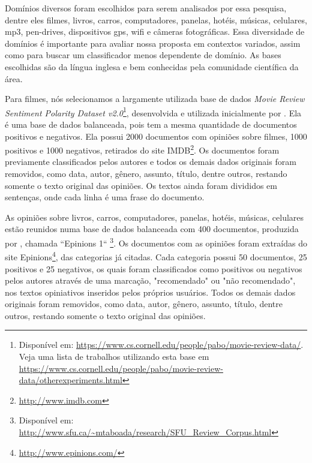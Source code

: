 \documentclass[template.tex]{subfiles}
\begin{document}
Domínios diversos foram escolhidos para serem analisados por essa pesquisa, dentre eles filmes, livros, carros, computadores, panelas, hotéis, músicas, celulares, mp3, pen-drives, dispositivos gps, wifi e câmeras fotográficas. Essa diversidade de domínios é importante para avaliar nossa proposta em contextos variados, assim como para buscar um classificador menos dependente de domínio. As bases escolhidas são da língua inglesa e bem conhecidas pela comunidade científica da área.

Para filmes, nós selecionamos a largamente utilizada base de dados \textit{Movie Review Sentiment Polarity Dataset v2.0}\footnote{Disponível em: \url{https://www.cs.cornell.edu/people/pabo/movie-review-data/}. Veja uma lista de trabalhos utilizando esta base em \url{https://www.cs.cornell.edu/people/pabo/movie-review-data/otherexperiments.html}}, desenvolvida e utilizada inicialmente por . Ela é uma base de dados balanceada, pois tem a mesma quantidade de documentos positivos e negativos. Ela possui 2000 documentos com opiniões sobre filmes, 1000 positivos e 1000 negativos, retirados do site IMDB\footnote{\url{http://www.imdb.com}}. Os documentos foram previamente classificados pelos autores e todos os demais dados originais foram removidos, como data, autor, gênero, assunto, título, dentre outros, restando somente o texto original das opiniões. Os textos ainda foram divididos em sentenças, onde cada linha é uma frase do documento.

As opiniões sobre livros, carros, computadores, panelas, hotéis, músicas, celulares estão reunidos numa base de dados balanceada com 400 documentos,  produzida por , chamada ``Epinions 1`` \footnote{Disponível em: \url{http://www.sfu.ca/~mtaboada/research/SFU_Review_Corpus.html}}. Os documentos com as opiniões foram extraídas do site Epinions\footnote{\url{http://www.epinions.com/}}, das categorias já citadas. Cada categoria possui 50 documentos, 25 positivos e 25 negativos, os quais foram classificados como positivos ou negativos pelos autores através de uma marcação, "recomendado" ou "não recomendado", nos textos opiniativos inseridos pelos próprios usuários. Todos os demais dados originais foram removidos, como data, autor, gênero, assunto, título, dentre outros, restando somente o texto original das opiniões.
\end{document}

